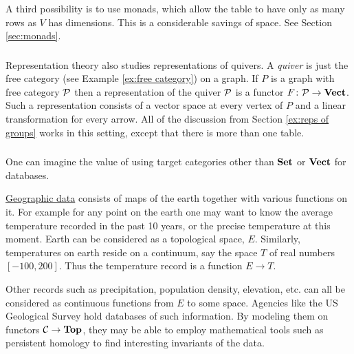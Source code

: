 \documentclass[CT4S-EN-RU]{subfiles}
\begin{document}
A third possibility is to use monads, which allow the table to have only as many rows as $V$ has dimensions. This is a considerable savings of space. See Section \ref{sec:monads}.


\subsubsection{}

Representation theory also studies representations of quivers. A {\em quiver} is just the free category (see Example \ref{ex:free category}) on a graph. If $P$ is a graph with free category $\mathcal{P}$ then a representation of the quiver $\mathcal{P}$ is a functor $F\colon\mathcal{P}\rightarrow{\bf Vect}$. Such a representation consists of a vector space at every vertex of $P$ and a linear transformation for every arrow. All of the discussion from Section \ref{ex:reps of groups} works in this setting, except that there is more than one table.


\subsubsection{}\label{sec:other targets}

One can imagine the value of using target categories other than ${\bf Set}$ or ${\bf Vect}$ for databases. 

\begin{application}

\href{http://en.wikipedia.org/wiki/Geographic_data}{\text Geographic data} consists of maps of the earth together with various functions on it. For example for any point on the earth one may want to know the average temperature recorded in the past 10 years, or the precise temperature at this moment. Earth can be considered as a topological space, $E$. Similarly, temperatures on earth reside on a continuum, say the space $T$ of real numbers $[-100,200]$. Thus the temperature record is a function $E\to T$. 

Other records such as precipitation, population density, elevation, etc. can all be considered as continuous functions from $E$ to some space. Agencies like the US Geological Survey hold databases of such information. By modeling them on functors $\mathcal{C}\rightarrow{\bf Top}$, they may be able to employ mathematical tools such as persistent homology \cite{WeS} to find interesting invariants of the data.

\end{application}
\end{document}
